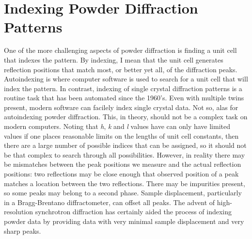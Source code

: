 \chapter{Indexing Powder Diffraction Patterns}\label{Chap:indexing}

One of the more challenging aspects of powder diffraction is finding a unit cell that indexes the pattern. By indexing, I mean that the unit cell generates reflection positions that match most, or better yet all, of the diffraction peaks.  Autoindexing is where computer software is used to search for a unit cell that will index the pattern. In contrast, indexing of single crystal diffraction patterns is a routine task that has been automated since the 1960's. Even with multiple twins present, modern software can facilely index single crystal data. Not so, alas for autoindexing powder diffraction. This, in theory, should not be a complex task on  modern computers. Noting that \textit{h}, \textit{k} and \textit{l} values have can only have limited values if one places reasonable limits on the lengths of unit cell constants, then there are a large number of possible indices that can be assigned, so it should not be that complex to search through all possibilities. However, in reality there may be mismatches between the peak positions we measure and the actual reflection positions: two reflections may be close enough that observed position of a peak matches a location between the two reflections. There may be impurities present, so some peaks may belong to a second phase. Sample displacement, particularly in a Bragg-Brentano diffractometer, can offset all peaks. The advent of high-resolution synchrotron diffraction has certainly aided the process of indexing powder data by providing data with very minimal sample displacement and very sharp peaks.  

